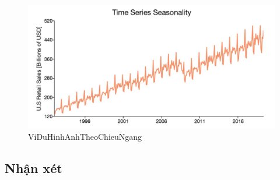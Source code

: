  
\begin{figure}[h] %
\centering
\includegraphics[width=1\textwidth]{pictures/ts-pp-seasonality.jpg} %
\caption{ViDuHinhAnhTheoChieuNgang} %
\label{pictures:nghia1} %
\end{figure} 






\subsection{Nhận xét}
\lipsum[1]
